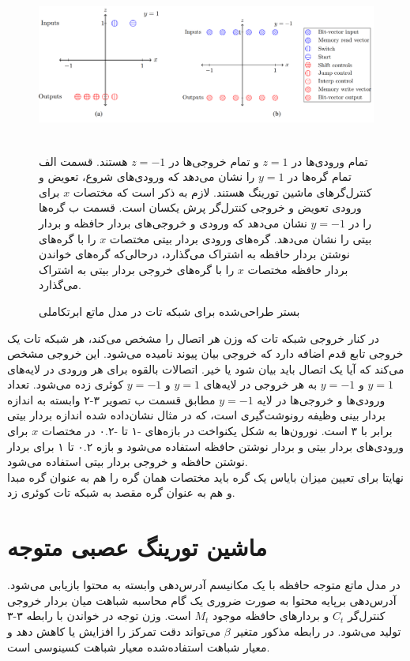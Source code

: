 \begin{figure}[!h]
\begin{center}
\includegraphics[height=5cm]{HyperENTM-Substrate.png}
\end{center}
\caption{بستر طراحی‌شده برای شبکه تات در مدل ماتع ابرتکاملی\cite{merrild2018hyperntm} }
\medskip
\small
تمام ورودی‌ها در $z=1$ و تمام خروجی‌ها در $z=-1$ هستند. قسمت الف تمام گره‌ها در $y=1$ را نشان می‌دهد که ورودی‌های شروع، تعویض و کنترل‌‌گرهای ماشین تورینگ هستند. لازم به ذکر است که مختصات $x$ برای ورودی تعویض و خروجی کنترل‌گر پرش یکسان است.
قسمت ب گره‌ها را در $y=-1‌$ نشان می‌دهد که ورودی و خروجی‌های بردار حافظه و بردار بیتی را نشان می‌دهد. گره‌های ورودی بردار بیتی مختصات $x$ را با گره‌های نوشتن بردار حافظه به اشتراک می‌گذارد، درحالی‌که گره‌های خواندن بردار حافظه مختصات $x$ را با گره‌های خروجی بردار بیتی به اشتراک می‌گذارد.\cite{merrild2018hyperntm}
\end{figure}

در کنار خروجی شبکه تات که وزن هر اتصال را مشخص می‌کند، هر شبکه تات یک خروجی تابع قدم اضافه دارد که خروجی بیان پیوند نامیده می‌شود. این خروجی مشخص می‌کند که آیا یک اتصال باید بیان شود یا خیر. اتصالات بالقوه برای هر ورودی در لایه‌های $y=1$ و $y=-1$ به هر خروجی در لایه‌های $y=1$ و $y=-1‌$ کوئری زده می‌شود. تعداد ورودی‌ها و خروجی‌ها در لایه $y=-1$ مطابق قسمت ب تصویر ۳-۲ وابسته به اندازه بردار بینی وظیفه رونوشت‌گیری است، که در مثال نشان‌داده شده اندازه بردار بیتی برابر با ۳ است. نورون‌ها به شکل یکنواخت در بازه‌های -۱ تا -۰.۲ در مختصات $x$ برای ورودی‌های بردار بیتی و بردار نوشتن حافظه استفاده می‌شود و بازه ۰.۲ تا ۱ برای بردار نوشتن حافظه و خروجی بردار بیتی استفاده می‌شود.\cite{merrild2018hyperntm} 
\\

نهایتا برای تعیین میزان بایاس یک گره باید مختصات همان گره را هم به عنوان گره مبدا و هم به عنوان گره مقصد به شبکه تات کوئری زد.\cite{merrild2018hyperntm}

\section{ماشین تورینگ عصبی متوجه}
در مدل ماتع متوجه حافظه با یک مکانیسم آدرس‌دهی وابسته به محتوا بازیابی می‌شود. آدرس‌دهی برپایه محتوا به صورت ضروری یک گام محاسبه شباهت میان بردار خروجی کنترل‌گر $C_t$ و بردارهای حافظه موجود $M_t$ است. وزن توجه در خواندن با رابطه ۳-۳ تولید می‌شود. در رابطه مذکور متغیر $\beta$ می‌تواند دقت تمرکز را افزایش یا کاهش دهد و معیار شباهت استفاده‌شده معیار شباهت کسینوسی است.\cite{zhao2020cold}

